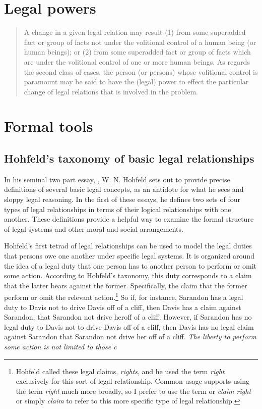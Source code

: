 \section{Legal powers}
\label{sec:legal-powers}
\begin{quote}
A change in a given legal relation may result (1) from some superadded fact or
group of facts not under the volitional control of a human being (or human
beings); or (2) from some superadded fact or group of facts which are under the
volitional control of one or more human beings.
As regards the second class of cases, the person (or persons) whose volitional
control is paramount may be said to have the (legal) power to effect the
particular change of legal relations that is involved in the problem.
\citep[p.
   44]{hohfeldfundamentallegal1913}
\end{quote}
\section{Formal tools}
\label{sec:formal-tools}
\subsection{Hohfeld's taxonomy of basic legal relationships}
\label{sec:hohf-taxon}
In his seminal two part essay, , W. N. Hohfeld
\citeyearpar{hohfeldfundamentallegal1913,hohfeldfundamentallegal1917} sets
out to provide precise definitions of several basic legal concepts, as an
antidote for what he sees and sloppy legal reasoning.
In the first of these essays, he defines two sets of four types of legal relationships in terms
of their logical relationships with one another.
These definitions provide a helpful way to examine the formal structure of legal
systems and other moral and social arrangements.

Hohfeld's first tetrad of legal relationships can be used to model the legal
duties that persons owe one another under specific legal systems.
It is organized around the idea of a legal duty that one person has to another
person to perform or omit some action.
According to Hohfeld's taxonomy, this duty corresponds to a claim that the
latter bears against the former.
Specifically, the claim that the former perform or omit the relevant
action.\footnote{Hohfeld called these legal claims, \emph{rights}, and he used the term \emph{right}
exclusively for this sort of legal relationship.
Common usage supports using the term \emph{right} much more broadly, so I prefer to use
the term or \emph{claim right} or simply \emph{claim} to refer to this more specific type of
legal relationship.}
So if, for instance, Sarandon has a legal duty to Davis not to drive Davis off of
a cliff, then Davis has a claim against Sarandon, that Sarandon not drive heroff
of a cliff.
However, if Sarandon has no legal duty to Davis not to drive Davis off of a
cliff, then Davis has no legal claim against Sarandon that Sarandon not drive
her off of a cliff.
\emph{The liberty to perform some action is not limited to those c}


